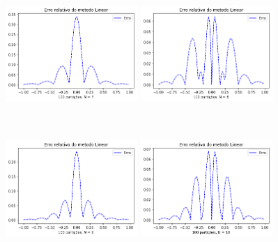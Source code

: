 \documentclass{article}
\begin{document}
\begin{figure}[!htb]
\includegraphics [width=5cm,height=5cm]{ELc7.png}
\includegraphics [width=5cm,height=5cm]{ELc8.png}
\includegraphics [width=5cm,height=5cm]{ELc9.png}
\includegraphics [width=5cm,height=5cm]{ELc10.png}
\end{figure}
\end{document}
